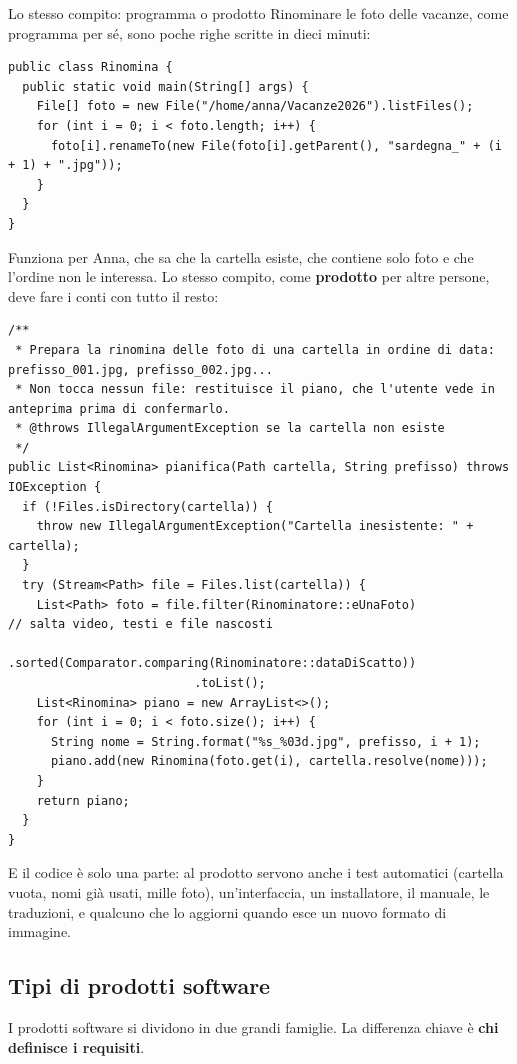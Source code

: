 \begin{esempio}{Lo stesso compito: programma o prodotto}
Rinominare le foto delle vacanze, come programma per sé, sono poche righe scritte in dieci minuti:
\begin{lstlisting}[style=java, name=Rinomina.java]
public class Rinomina {
  public static void main(String[] args) {
    File[] foto = new File("/home/anna/Vacanze2026").listFiles();
    for (int i = 0; i < foto.length; i++) {
      foto[i].renameTo(new File(foto[i].getParent(), "sardegna_" + (i + 1) + ".jpg"));
    }
  }
}
\end{lstlisting}
Funziona per Anna, che sa che la cartella esiste, che contiene solo foto e che l'ordine non le interessa. Lo stesso
compito, come \textbf{prodotto} per altre persone, deve fare i conti con tutto il resto:
\begin{lstlisting}[style=java, name=Rinominatore.java]
/**
 * Prepara la rinomina delle foto di una cartella in ordine di data: prefisso_001.jpg, prefisso_002.jpg...
 * Non tocca nessun file: restituisce il piano, che l'utente vede in anteprima prima di confermarlo.
 * @throws IllegalArgumentException se la cartella non esiste
 */
public List<Rinomina> pianifica(Path cartella, String prefisso) throws IOException {
  if (!Files.isDirectory(cartella)) {
    throw new IllegalArgumentException("Cartella inesistente: " + cartella);
  }
  try (Stream<Path> file = Files.list(cartella)) {
    List<Path> foto = file.filter(Rinominatore::eUnaFoto)              // salta video, testi e file nascosti
                          .sorted(Comparator.comparing(Rinominatore::dataDiScatto))
                          .toList();
    List<Rinomina> piano = new ArrayList<>();
    for (int i = 0; i < foto.size(); i++) {
      String nome = String.format("%s_%03d.jpg", prefisso, i + 1);
      piano.add(new Rinomina(foto.get(i), cartella.resolve(nome)));
    }
    return piano;
  }
}
\end{lstlisting}
E il codice è solo una parte: al prodotto servono anche i test automatici (cartella vuota, nomi già usati, mille foto),
un'interfaccia, un installatore, il manuale, le traduzioni, e qualcuno che lo aggiorni quando esce un nuovo formato di
immagine.
\end{esempio}

\subsection{Tipi di prodotti software}

I prodotti software si dividono in due grandi famiglie. La differenza chiave è \textbf{chi definisce i requisiti}.

